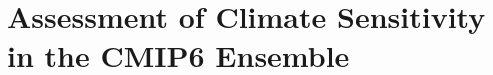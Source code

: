 
%



\chapter{Assessment of Climate Sensitivity in the \acs{CMIP}6 Ensemble}
\label{ch:04:papers_ecs_tcr_assessment}

